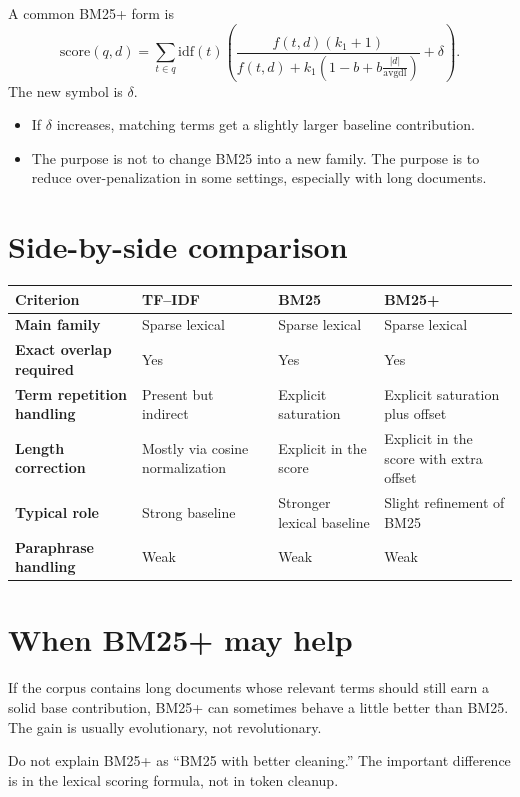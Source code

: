 \documentclass[11pt,oneside]{report}
\begin{document}
\begin{formulabox}
A common BM25+ form is
\[
\mathrm{score}(q,d)=\sum_{t\in q}\mathrm{idf}(t)
\left(
\frac{f(t,d)(k_1+1)}{f(t,d)+k_1\left(1-b+b\frac{|d|}{\mathrm{avgdl}}\right)}+\delta
\right).
\]
The new symbol is $\delta$.
\begin{itemize}
\item If $\delta$ increases, matching terms get a slightly larger baseline contribution.
\item The purpose is not to change BM25 into a new family. The purpose is to reduce over-penalization in some settings, especially with long documents.
\end{itemize}
\end{formulabox}

\section*{Side-by-side comparison}
\begin{center}
\begin{tabularx}{\textwidth}{>{\bfseries}lYYY}
\toprule
Criterion & TF--IDF & BM25 & BM25+ \\
\midrule
Main family & Sparse lexical & Sparse lexical & Sparse lexical \\
Exact overlap required & Yes & Yes & Yes \\
Term repetition handling & Present but indirect & Explicit saturation & Explicit saturation plus offset \\
Length correction & Mostly via cosine normalization & Explicit in the score & Explicit in the score with extra offset \\
Typical role & Strong baseline & Stronger lexical baseline & Slight refinement of BM25 \\
Paraphrase handling & Weak & Weak & Weak \\
\bottomrule
\end{tabularx}
\end{center}

\section*{When BM25+ may help}
If the corpus contains long documents whose relevant terms should still earn a solid base contribution, BM25+ can sometimes behave a little better than BM25. The gain is usually evolutionary, not revolutionary.

\begin{warningbox}
Do not explain BM25+ as ``BM25 with better cleaning.'' The important difference is in the lexical scoring formula, not in token cleanup.
\end{warningbox}
\end{document}
